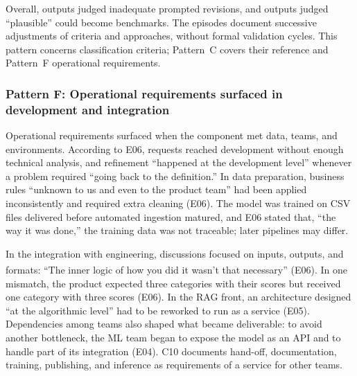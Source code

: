 \documentclass[sigconf,nonacm]{acmart}
\begin{document}
Overall, outputs judged inadequate prompted revisions, and outputs judged ``plausible'' could become benchmarks. The episodes document successive adjustments of criteria and approaches, without formal validation cycles. This pattern concerns classification criteria; Pattern~C covers their reference and Pattern~F operational requirements.


\subsubsection{Pattern F: Operational requirements surfaced in development and integration}
\label{sec:pf}

Operational requirements surfaced when the component met data, teams, and environments. According to E06, requests reached development without enough technical analysis, and refinement ``happened at the development level'' whenever a problem required ``going back to the definition.'' In data preparation, business rules ``unknown to us and even to the product team'' had been applied inconsistently and required extra cleaning (E06). The model was trained on CSV files delivered before automated ingestion matured, and E06 stated that, ``the way it was done,'' the training data was not traceable; later pipelines may differ.

In the integration with engineering, discussions focused on inputs, outputs, and formats: ``The inner logic of how you did it wasn't that necessary'' (E06\textsuperscript{\dag}). In one mismatch, the product expected three categories with their scores but received one category with three scores (E06). In the RAG front, an architecture designed ``at the algorithmic level'' had to be reworked to run as a service (E05). Dependencies among teams also shaped what became deliverable: to avoid another bottleneck, the ML team began to expose the model as an API and to handle part of its integration (E04). C10 documents hand-off, documentation, training, publishing, and inference as requirements of a service for other teams.
\end{document}
